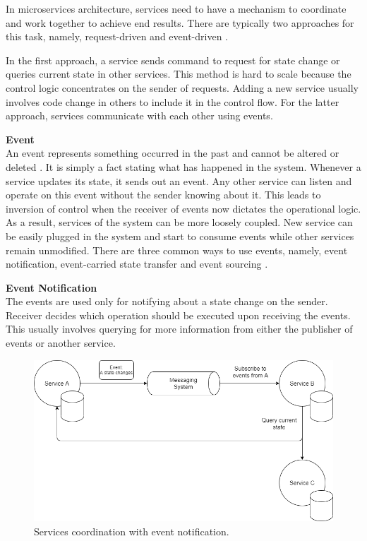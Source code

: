 In microservices architecture, services need to have a mechanism to coordinate and work together to achieve end results. There are typically two approaches for this task, namely, request-driven and event-driven \cite{stopford2018designingeventdriven}.

In the first approach, a service sends command to request for state change or queries current state in other services. This method is hard to scale because the control logic concentrates on the sender of requests. Adding a new service usually involves code change in others to include it in the control flow. For the latter approach, services communicate with each other using events.

\textbf{Event}\\
An event represents something occurred in the past and cannot be altered or deleted \cite{cqrsgregyoung}. It is simply a fact stating what has happened in the system. Whenever a service updates its state, it sends out an event. Any other service can listen and operate on this event without the sender knowing about it. This leads to inversion of control when the receiver of events now dictates the operational logic. As a result, services of the system can be more loosely coupled. New service can be easily plugged in the system and start to consume events while other services remain unmodified. There are three common ways to use events, namely, event notification, event-carried state transfer and event sourcing \cite{martinfowlereventdriven}.

\textbf{Event Notification}\\
The events are used only for notifying about a state change on the sender. Receiver decides which operation should be executed upon receiving the events. This usually involves querying for more information from either the publisher of events or another service.   
\begin{figure}[h]
	\includegraphics[width=\linewidth]{images/eventnotification.png}
	\caption{Services coordination with event notification.}
	\label{fig:eventnotification}
\end{figure}

